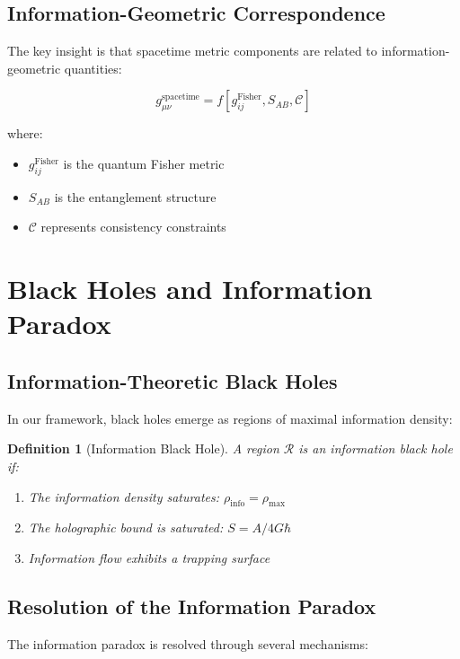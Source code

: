 \documentclass[12pt]{article}
\newtheorem{definition}[theorem]{Definition}
\begin{document}
\subsection{Information-Geometric Correspondence}

The key insight is that spacetime metric components are related to information-geometric quantities:

\begin{equation}
g_{\mu\nu}^{\text{spacetime}} = f[g_{ij}^{\text{Fisher}}, S_{AB}, \mathcal{C}]
\end{equation}

where:
\begin{itemize}
\item $g_{ij}^{\text{Fisher}}$ is the quantum Fisher metric
\item $S_{AB}$ is the entanglement structure
\item $\mathcal{C}$ represents consistency constraints
\end{itemize}

\section{Black Holes and Information Paradox}

\subsection{Information-Theoretic Black Holes}

In our framework, black holes emerge as regions of maximal information density:

\begin{definition}[Information Black Hole]
A region $\mathcal{R}$ is an information black hole if:
\begin{enumerate}
\item The information density saturates: $\rho_{\text{info}} = \rho_{\text{max}}$
\item The holographic bound is saturated: $S = A/4G\hbar$
\item Information flow exhibits a trapping surface
\end{enumerate}
\end{definition}

\subsection{Resolution of the Information Paradox}

The information paradox is resolved through several mechanisms:
\end{document}
